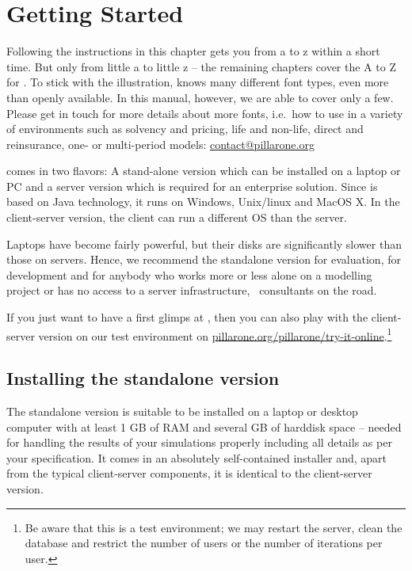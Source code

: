 \chapter{Getting Started}
\label{chap:refguide-getstart}

Following the instructions in this chapter gets you from a to z within a short time. But only from little a to little z -- the remaining chapters cover the A to Z for \RA. To stick with the illustration, \RA{} knows many different font types, even more than openly available. In this manual, however, we are able to cover only a few. Please get in touch for more details about more fonts, i.e.~how to use \RA{} in a variety of environments such as solvency and pricing, life and non-life, direct and reinsurance, one- or multi-period models:  \href{mailto:contact@pillarone.org}{contact@pillarone.org}

\RA{} comes in two flavors: A stand-alone version which can be installed on a laptop or PC and a server version which is required for an enterprise solution. Since \PO{} is based on Java technology, it runs on Windows, Unix/linux and MacOS X. In the client-server version, the client can run a different OS than the server. 

Laptops have become fairly powerful, but their disks are significantly slower than those on servers. Hence, we recommend the standalone version for evaluation, for development and for anybody who works more or less alone on a modelling project or has no access to a server infrastructure, \eg~consultants on the road.

If you just want to have a first glimps at \RA, then you can also play with the client-server version on our test environment on \href{http://pillarone.org/pillarone/try-it-online}{pillarone.org/pillarone/try-it-online}.\footnote{Be aware that this is a test environment; we may restart the server, clean the database and restrict the number of users or the number of iterations per user.}

\section{Installing the standalone version}
\label{sec:refguide-install-standalone}

The standalone version is suitable to be installed on a laptop or desktop computer with at least 1 GB of RAM and several GB of harddisk space -- needed for handling the results of your simulations properly including all details as per your specification. It comes in an absolutely self-contained installer and, apart from the typical client-server components, it is identical to the client-server version. 

